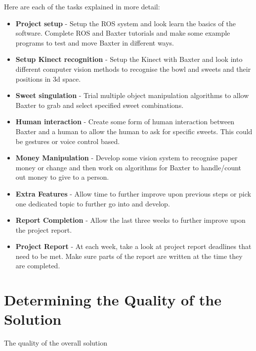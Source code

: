 Here are each of the tasks explained in more detail:
\begin{itemize}
\item{\textbf{Project setup} - Setup the ROS system and look learn the basics of the software. Complete ROS and Baxter tutorials and make some example programs to test and move Baxter in different ways.}
\item{\textbf{Setup Kinect recognition} - Setup the Kinect with Baxter and look into different computer vision methods to recognise the bowl and sweets and their positions in 3d space.}
\item{\textbf{Sweet singulation} - Trial multiple object manipulation algorithms to allow Baxter to grab and select specified sweet combinations.}
\item{\textbf{Human interaction} - Create some form of human interaction between Baxter and a human to allow the human to ask for specific sweets. This could be gestures or voice control based.}
\item{\textbf{Money Manipulation} - Develop some vision system to recognise paper money or change and then work on algorithms for Baxter to handle/count out money to give to a person.}
\item{\textbf{Extra Features} - Allow time to further improve upon previous steps or pick one dedicated topic to further go into and develop.}
\item{\textbf{Report Completion} - Allow the last three weeks to further improve upon the project report.}
\item{\textbf{Project Report} - At each week, take a look at project report deadlines that need to be met. Make sure parts of the report are written at the time they are completed.}
\end{itemize}
\section{Determining the Quality of the Solution}
The quality of the overall solution 
\let\cleardoublepage\clearpage